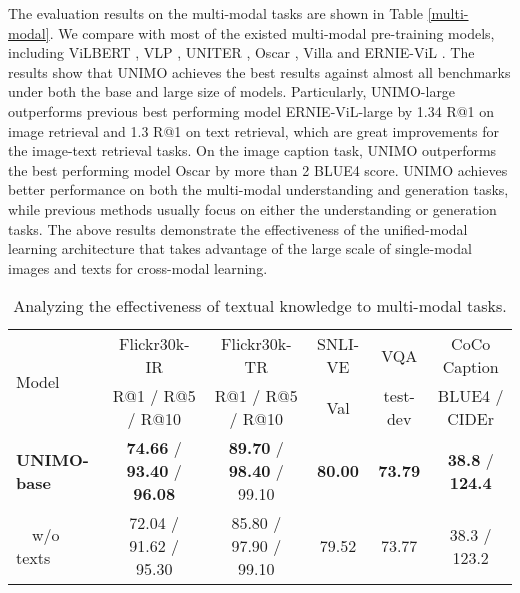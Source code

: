 \documentclass[11pt,a4paper]{article}
\begin{document}
The evaluation results on the multi-modal tasks are shown in Table \ref{multi-modal}.
We compare with most of the existed multi-modal pre-training models, including ViLBERT \citep{lu2019vilbert}, VLP \citep{zhou2020unified}, UNITER \citep{chen2020uniter}, Oscar \citep{li2020oscar}, Villa \citep{gan2020large} and ERNIE-ViL \citep{yu2020ernie}.
The results show that UNIMO achieves the best results against almost all benchmarks under both the base and large size of models.
Particularly, UNIMO-large outperforms previous best performing model ERNIE-ViL-large by 1.34 R@1 on image retrieval and 1.3 R@1 on text retrieval, which are great improvements for the image-text retrieval tasks.
On the image caption task, UNIMO outperforms the best performing model Oscar by more than 2 BLUE4 score.
UNIMO achieves better performance on both the multi-modal understanding and generation tasks, while previous methods usually focus on either the understanding or generation tasks.
The above results demonstrate the effectiveness of the unified-modal learning architecture that takes advantage of the large scale of single-modal images and texts for cross-modal learning.




\begin{table*}[ht!]
\centering
\small
\begin{tabular}{l c c c c c}
\hline \hline
\multirow{2}{*}{Model} & Flickr30k-IR & Flickr30k-TR & SNLI-VE & VQA & CoCo Caption  \\
& R@1 / R@5 / R@10 & R@1 / R@5 / R@10 & Val & test-dev  & BLUE4 / CIDEr \\
\hline
\hline
\textbf{UNIMO-base} & \textbf{74.66} / \textbf{93.40} / \textbf{96.08} & \textbf{89.70} / \textbf{98.40} / 99.10 & \textbf{80.00} & \textbf{73.79} & \textbf{38.8} / \textbf{124.4}  \\
\ \ w/o texts & 72.04 / 91.62 / 95.30 & 85.80 / 97.90 / 99.10 & 79.52 & 73.77 & 38.3 / 123.2 \\
\hline
\end{tabular}
\caption{\label{text-vision}
Analyzing the effectiveness of textual knowledge to multi-modal tasks.
}
\end{table*}
\end{document}
